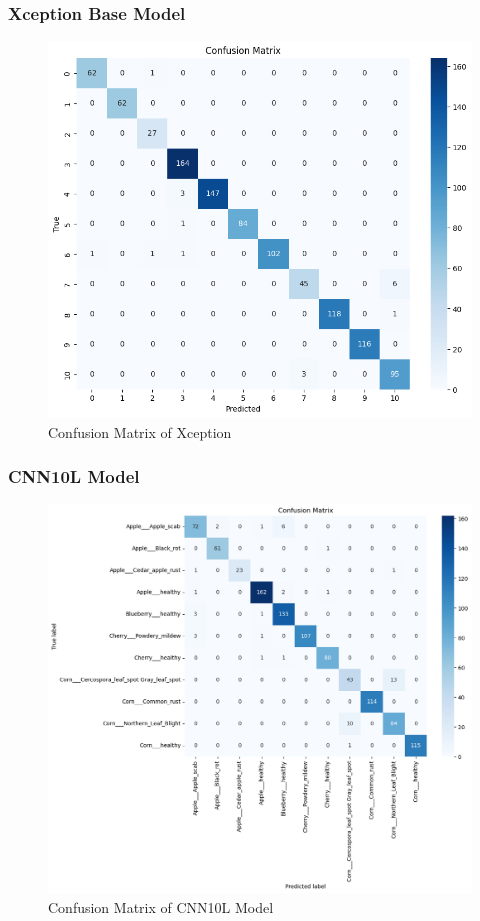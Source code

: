 \subsubsection{Xception Base Model}
\begin{figure}
    \centering
    \includegraphics[width=1\linewidth]{graphics//chapter6/cm xception.png}
    \caption{Confusion Matrix of Xception}
    \label{fig:cm-xception}
\end{figure}

\subsubsection{CNN10L Model}
\begin{figure}
    \centering
    \includegraphics[width=1\linewidth]{graphics/chapter6/cm cnn10l.png}
    \caption{Confusion Matrix of CNN10L Model}
    \label{fig:cm-CNN10L}
\end{figure}



